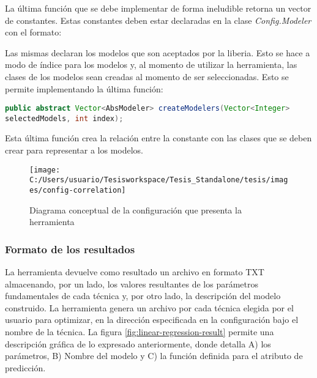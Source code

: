 La última función que se debe implementar de forma ineludible retorna
un vector de constantes. Estas constantes deben estar declaradas en
la clase \emph{Config.Modeler} con el formato: 


Las mismas declaran los modelos que son aceptados por la liberia.
Esto se hace a modo de índice para los modelos y, al momento de utilizar
la herramienta, las clases de los modelos sean creadas al momento
de ser seleccionadas. Esto se permite implementando la última función: 

\lstinline[language=Java,basicstyle={\footnotesize}]!public abstract Vector<AbsModeler> createModelers(Vector<Integer> selectedModels, int index);!

Esta última función crea la relación entre la constante con las clases
que se deben crear para representar a los modelos. 

\begin{figure}
\begin{centering}
\texttt{[image: C:/Users/usuario/Tesisworkspace/Tesis\_Standalone/tesis/images/config-correlation]}
\par\end{centering}

\caption{Diagrama conceptual de la configuración que presenta la herramienta\label{fig:config-correlation}}
\end{figure}



\subsubsection{Formato de los resultados\label{subsec:Formato-de-los}}

La herramienta devuelve como resultado un archivo en formato TXT almacenando,
por un lado, los valores resultantes de los parámetros fundamentales
de cada técnica y, por otro lado, la descripción del modelo construido.
La herramienta genera un archivo por cada técnica elegida por el usuario
para optimizar, en la dirección especificada en la configuración bajo
el nombre de la técnica. La figura \ref{fig:linear-regression-result}
permite una descripción gráfica de lo expresado anteriormente, donde
detalla A) los parámetros, B) Nombre del modelo y C) la función definida
para el atributo de predicción. 

